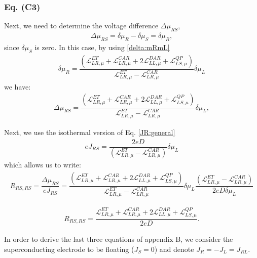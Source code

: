 \subsubsection{Eq. (C3)}

Next, we need to determine the voltage difference $\Delta\mu_{RS}$,
\begin{align*}
\Delta\mu_{RS}=\delta\mu_{R}-\delta\mu_{S}
=
\delta\mu_{R},
\end{align*}
since $\delta\mu_{S}$ is zero. In this case, by using \eqref{delta:mRmL}
\begin{align*}
\delta\mu_{R}=\dfrac{(\mathcal{L}_{LR,\mu}^{ET}+\mathcal{L}_{LR,\mu}^{CAR}+2\mathcal{L}_{LL,\mu}^{DAR}
+
\mathcal{L}^{QP}_{LS,\mu})}{\mathcal{L}_{LR,\mu}^{ET}-\mathcal{L}_{LR,\mu}^{CAR}}\delta\mu_{L}
\end{align*}
we have:
\begin{align*}
\Delta\mu_{RS}=\dfrac{(\mathcal{L}_{LR,\mu}^{ET}+\mathcal{L}_{LR,\mu}^{CAR}+2\mathcal{L}_{LL,\mu}^{DAR}
+
\mathcal{L}^{QP}_{LS,\mu})}{\mathcal{L}_{LR,\mu}^{ET}-\mathcal{L}_{LR,\mu}^{CAR}}\delta\mu_{L},
\end{align*}

Next, we use the isothermal version of Eq. \eqref{JR:general}
\begin{align*}
eJ_{RS}=
\dfrac{2eD}{(\mathcal{L}_{LR,\mu}^{ET}-\mathcal{L}_{LR,\mu}^{CAR})}\delta\mu_{L}
\end{align*}
which allows us to write:
\begin{align*}
    R_{RS,RS}=
\dfrac{\Delta\mu_{RS}}{eJ_{RS}}
=
\dfrac{(\mathcal{L}_{LR,\mu}^{ET}+\mathcal{L}_{LR,\mu}^{CAR}+2\mathcal{L}_{LL,\mu}^{DAR}
+
\mathcal{L}^{QP}_{LS,\mu})}{\mathcal{L}_{LR,\mu}^{ET}-\mathcal{L}_{LR,\mu}^{CAR}}\delta\mu_{L}\dfrac{(\mathcal{L}_{LR,\mu}^{ET}-\mathcal{L}_{LR,\mu}^{CAR})}{2eD\delta\mu_{L}}
\end{align*}


\begin{align}\label{RRSRS}
R_{RS,RS}=
\dfrac{\mathcal{L}_{LR,\mu}^{ET}+\mathcal{L}_{LR,\mu}^{CAR}+2\mathcal{L}_{LL,\mu}^{DAR}
+
\mathcal{L}^{QP}_{LS,\mu}}{2eD}.
\end{align}


In order to derive the last three equations of appendix B, we consider the superconducting electrode to be floating ($J_{S}=0$) and denote $J_{R}=-J_{L}=J_{RL}$. 

